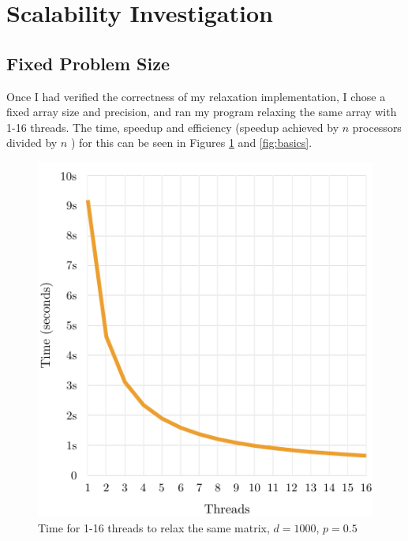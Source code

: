 \documentclass[12pt]{article}
\begin{document}
\section{Scalability Investigation}
\subsection{Fixed Problem Size}
Once I had verified the correctness of my relaxation implementation, I chose a fixed array size and precision, and ran my program relaxing the same array with 1-16 threads. The time, speedup and efficiency (speedup achieved by $n$ processors divided by $n$ \citep{speedup}) for this can be seen in Figures \ref{fig:basict} and \ref{fig:basics}. 
\begin{figure}[!htb]
    \begin{minipage}{.46\textwidth}
        \hspace{-0.8cm}\includegraphics[width=1.1\textwidth]{img/basic-threads-time.pdf}
        \centering\caption{Time for 1-16 threads to relax the same matrix, $d=1000$, $p=0.5$}
        \label{fig:basict}
    \end{minipage}\hspace{0.4cm}
    \begin{minipage}{0.53\textwidth}

\end{minipage}
\end{figure}
\end{document}
